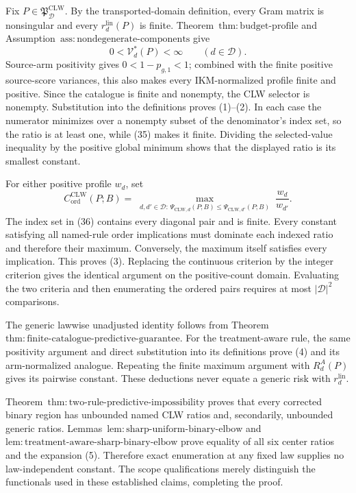 Fix \(P\in\mathfrak P_{\mathcal D}^{\mathrm{CLW}}\).  By the transported-domain definition, every Gram matrix is nonsingular and every \(r_d^{\mathrm{lin}}(P)\) is finite.  Theorem~\(\mathrm{thm{:}budget\text{-}profile}\) and Assumption~\(\mathrm{ass{:}nondegenerate\text{-}components}\) give
\[
 0<\mathcal V_d^*(P)<\infty
 \qquad(d\in\mathcal D).                                  \tag{35}
\]
Source-arm positivity gives \(0<1-p_{g,1}<1\); combined with the finite positive source-score variances, this also makes every IKM-normalized profile finite and positive.  Since the catalogue is finite and nonempty, the CLW selector is nonempty.  Substitution into the definitions proves (1)--(2).  In each case the numerator minimizes over a nonempty subset of the denominator's index set, so the ratio is at least one, while (35) makes it finite.  Dividing the selected-value inequality by the positive global minimum shows that the displayed ratio is its smallest constant.

For either positive profile \(w_d\), set
\[
 C_{\mathrm{ord}}^{\mathrm{CLW}}(P;B)
 =\max_{\substack{d,d'\in\mathcal D:\,
 \Psi_{\mathrm{CLW},d}(P;B)\le
 \Psi_{\mathrm{CLW},d'}(P;B)}}\frac{w_d}{w_{d'}}.         \tag{36}
\]
The index set in (36) contains every diagonal pair and is finite.  Every constant satisfying all named-rule order implications must dominate each indexed ratio and therefore their maximum.  Conversely, the maximum itself satisfies every implication.  This proves (3).  Replacing the continuous criterion by the integer criterion gives the identical argument on the positive-count domain.  Evaluating the two criteria and then enumerating the ordered pairs requires at most \(|\mathcal D|^2\) comparisons.

The generic lawwise unadjusted identity follows from Theorem~\(\mathrm{thm{:}finite\text{-}catalogue\text{-}predictive\text{-}guarantee}\).  For the treatment-aware rule, the same positivity argument and direct substitution into its definitions prove (4) and its arm-normalized analogue.  Repeating the finite maximum argument with \(R_d^A(P)\) gives its pairwise constant.  These deductions never equate a generic risk with \(r_d^{\mathrm{lin}}\).

Theorem~\(\mathrm{thm{:}two\text{-}rule\text{-}predictive\text{-}impossibility}\) proves that every corrected binary region has unbounded named CLW ratios and, secondarily, unbounded generic ratios.  Lemmas~\(\mathrm{lem{:}sharp\text{-}uniform\text{-}binary\text{-}elbow}\) and \(\mathrm{lem{:}treatment\text{-}aware\text{-}sharp\text{-}binary\text{-}elbow}\) prove equality of all six center ratios and the expansion (5).  Therefore exact enumeration at any fixed law supplies no law-independent constant.  The scope qualifications merely distinguish the functionals used in these established claims, completing the proof.